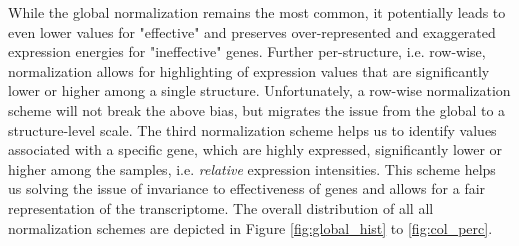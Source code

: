\documentclass[]{article}
\begin{document}
While the global normalization remains the most common, it potentially leads to even lower values for "effective" and preserves over-represented and exaggerated expression energies for "ineffective" genes.
Further per-structure, i.e. row-wise, normalization allows for highlighting of expression values that are significantly lower or higher among a single structure. Unfortunately, a row-wise normalization scheme will not break the above bias, but migrates the issue from the global to a structure-level scale. The third normalization scheme helps us to identify values associated with a specific gene, which are highly expressed, significantly lower or higher among the samples, i.e. \textit{relative} expression intensities. This scheme helps us solving the issue of invariance to effectiveness of genes and allows for a fair representation of the transcriptome. The overall distribution of all all normalization schemes are depicted in Figure \ref{fig:global_hist} to \ref{fig:col_perc}.\\
\end{document}
